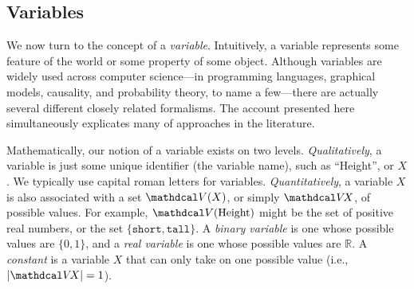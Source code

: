 


\subsection{Variables}
    \label{ssec:basic-vars}
We now turn to the concept of a \emph{variable}.
Intuitively, a variable represents some feature of the world or some property of some object. 
Although variables are widely used across computer science---in programming languages, graphical models, causality, and probability theory, to name a few---there are actually several different closely related formalisms. 
The account presented here simultaneously explicates many of approaches in the literature. 

Mathematically, our notion of a variable exists on two levels.
\emph{Qualitatively}, a variable is just some unique identifier (the variable name), such as ``Height'', or $X$. 
We typically use capital roman letters for variables.
\emph{Quantitatively}, a variable $X$ is also associated with a set $\V(X)$, or simply $\V\!X$, of possible values. 
For example, $\V(\text{Height})$ might be the set of positive real numbers, 
    or the set $\{ \texttt{short}, \texttt{tall} \}$. 
A \emph{binary variable} is one whose possible values are $\{0, 1\}$, and a 
    \emph{real variable} is one whose possible values are $\mathbb R$. 
A \emph{constant} is a variable $X$ that can only take on one possible value (i.e., $|\V\! X| = 1$).

